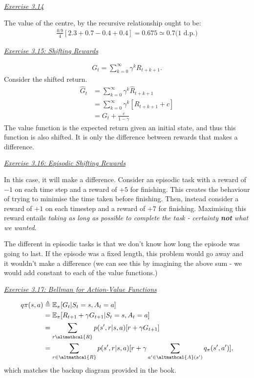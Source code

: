 \documentclass{article}
\newcommand{\myq}[1]{%
	\vspace{1em}
	\noindent\underline{\emph{Exercise #1}}\vspace{0.25em}\linebreak
}
\begin{document}
\myq{3.14}
The value of the centre, by the recursive relationship ought to be:
\begin{align}
\frac{0.9}{4} [2.3 + 0.7 -0.4 + 0.4] = 0.675 \simeq 0.7 \text{(1 d.p.)}
\end{align}

\myq{3.15: Shifting Rewards}
\begin{align}
G_t = \sum_{k=0}^{\infty} \gamma^k R_{t+k+1}.
\end{align}
Consider the shifted return.
\begin{align}
\hat{G}_t &= \sum_{k=0}^{\infty} \gamma^k \hat{R}_{t+k+1} \nonumber \\
&=\sum_{k=0}^{\infty} \gamma^k [R_{t+k+1} + c] \nonumber \\
&= G_t + \frac{c}{1 - \gamma}
\end{align}
The value function is the expected return given an initial state, and thus this function is also shifted. It is only the difference between rewards that makes a difference. 

\myq{3.16: Episodic Shifting Rewards}
In this case, it will make a difference. Consider an episodic task with a reward of $-1$ on each time step and a reward of $+5$ for finishing. This creates the behaviour of trying to minimise the time taken before finishing. Then, instead consider a reward of $+1$ on each timestep and a reward of $+7$ for finishing. Maximising this reward entails \emph{taking as long as possible to complete the task - certainty \textbf{not} what we wanted}. 

The different in episodic tasks is that we don't know how long the episode was going to last. If the episode was a fixed length, this problem would go away and it wouldn't make a difference (we can see this by imagining the above sum - we would add constant to each of the value functions.)

\myq{3.17: Bellman for Action-Value Functions}
\begin{align}
q\pi(s, a) &\triangleq \mathbb{E}_\pi [G_t | S_t = s, A_t = a] \nonumber \\
&= \mathbb{E}_\pi[R_{t+1} + \gamma G_{t+1} | S_t = s, A_t = a] \nonumber \\
&= \sum_{r \altmathcal{R}} p(s', r | s, a) [r + \gamma G_{t+1}] \nonumber \\
&= \sum_{r \in \altmathcal{R}} p(s', r | s, a) [r + \gamma \sum_{a' \in \altmathcal{A}(s')} q_\pi(s', a')],
\end{align}
which matches the backup diagram provided in the book. 
\end{document}
